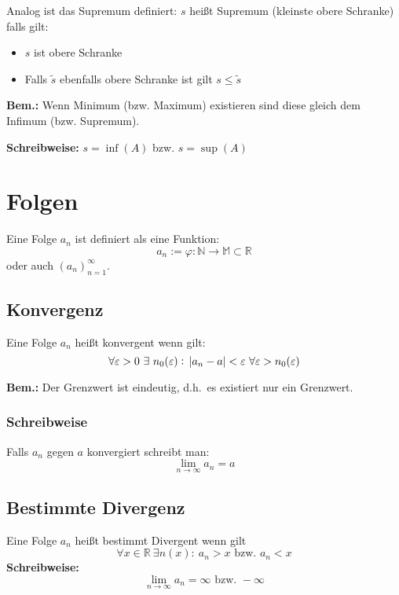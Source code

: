 \documentclass[10pt]{article}
\newcommand{\an}{{(a_n)}_{n=1}^\infty}
\begin{document}
     Analog ist das Supremum definiert: $s$ heißt Supremum (kleinste obere Schranke) falls gilt:
    \begin{itemize}
        \item $s$ ist obere Schranke
        \item Falls $\tilde{s}$ ebenfalls obere Schranke ist gilt
        $s\leq\tilde{s}$
    \end{itemize}

    \textbf{Bem.:}
    Wenn Minimum (bzw. Maximum) existieren sind diese gleich dem
    Infimum (bzw. Supremum).

    \textbf{Schreibweise:}
    $s = \inf{(A)}$ bzw. $s = \sup{(A)}$


    \section{Folgen}
    Eine Folge $a_n$ ist definiert als eine Funktion:
    \begin{equation*}
        a_n := \varphi: \mathbb{N} \rightarrow \mathbb{M} \subset \mathbb{R}
    \end{equation*}
    oder auch $\an$.

    \subsection{Konvergenz}
    Eine Folge $a_n$ heißt konvergent wenn gilt:
    \begin{equation*}
        \forall \varepsilon>0\ \exists~n_0(\varepsilon):\ \abs{a_n - a} < \varepsilon\ \forall \varepsilon > n_0(\varepsilon)
    \end{equation*}

    \textbf{Bem.:}
    Der Grenzwert ist eindeutig, d.h.\ es existiert nur ein Grenzwert.

    \subsubsection{Schreibweise}
    Falls $a_n$ gegen $a$ konvergiert schreibt man:
    \begin{equation*}
        \lim_{n \rightarrow \infty} a_n = a
    \end{equation*}

    \subsection{Bestimmte Divergenz}
    Eine Folge $a_n$ heißt bestimmt Divergent wenn gilt
    \begin{equation*}
        \forall x \in \mathbb{R}\ \exists n(x):\ a_n>x \text{ bzw. } a_n<x
    \end{equation*}
    \textbf{Schreibweise:}
    \begin{equation*}
        \lim_{n \rightarrow \infty} a_n = \infty \text{ bzw. } -\infty
    \end{equation*}
\end{document}
